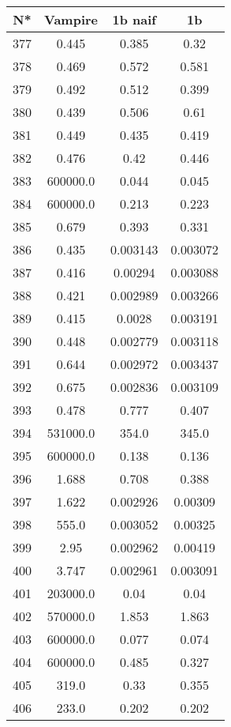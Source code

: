\begin{table}[H]
\begin{tabular}{|c|c|c|c|}
\hline
N* & Vampire & 1b naif & 1b \\
\hline
377 & 0.445 & 0.385 & 0.32 \\
\hline
378 & 0.469 & 0.572 & 0.581 \\
\hline
379 & 0.492 & 0.512 & 0.399 \\
\hline
380 & 0.439 & 0.506 & 0.61 \\
\hline
381 & 0.449 & 0.435 & 0.419 \\
\hline
382 & 0.476 & 0.42 & 0.446 \\
\hline
383 & 600000.0 & 0.044 & 0.045 \\
\hline
384 & 600000.0 & 0.213 & 0.223 \\
\hline
385 & 0.679 & 0.393 & 0.331 \\
\hline
386 & 0.435 & 0.003143 & 0.003072 \\
\hline
387 & 0.416 & 0.00294 & 0.003088 \\
\hline
388 & 0.421 & 0.002989 & 0.003266 \\
\hline
389 & 0.415 & 0.0028 & 0.003191 \\
\hline
390 & 0.448 & 0.002779 & 0.003118 \\
\hline
391 & 0.644 & 0.002972 & 0.003437 \\
\hline
392 & 0.675 & 0.002836 & 0.003109 \\
\hline
393 & 0.478 & 0.777 & 0.407 \\
\hline
394 & 531000.0 & 354.0 & 345.0 \\
\hline
395 & 600000.0 & 0.138 & 0.136 \\
\hline
396 & 1.688 & 0.708 & 0.388 \\
\hline
397 & 1.622 & 0.002926 & 0.00309 \\
\hline
398 & 555.0 & 0.003052 & 0.00325 \\
\hline
399 & 2.95 & 0.002962 & 0.00419 \\
\hline
400 & 3.747 & 0.002961 & 0.003091 \\
\hline
401 & 203000.0 & 0.04 & 0.04 \\
\hline
402 & 570000.0 & 1.853 & 1.863 \\
\hline
403 & 600000.0 & 0.077 & 0.074 \\
\hline
404 & 600000.0 & 0.485 & 0.327 \\
\hline
405 & 319.0 & 0.33 & 0.355 \\
\hline
406 & 233.0 & 0.202 & 0.202 \\

\end{tabular}
\end{table}

